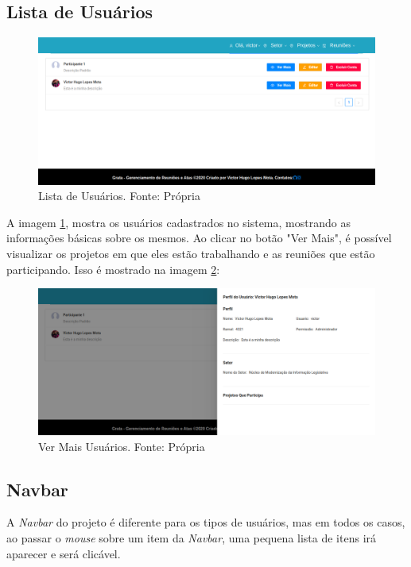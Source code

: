 \subsection{Lista de Usuários}

\begin{figure}[H]
    \centering
    \includegraphics[width=1.0\textwidth]{figuras/lista_de_usuarios.png}
    \caption{Lista de Usuários. Fonte: Própria}
    \label{img:lista_de_usuarios}
\end{figure}

A imagem \ref{img:lista_de_usuarios}, mostra os usuários cadastrados no sistema, mostrando as informações básicas sobre os mesmos. Ao clicar no botão "Ver Mais", é possível visualizar os projetos em que eles estão trabalhando e as reuniões que estão participando. Isso é mostrado na imagem \ref{img:ver_mais}:

\begin{figure}[H]
    \centering
    \includegraphics[width=1.0\textwidth]{figuras/ver_mais_usuarios.png}
    \caption{Ver Mais Usuários. Fonte: Própria}
    \label{img:ver_mais}
\end{figure}

\subsection{Navbar}

A \textit{Navbar} do projeto é diferente para os tipos de usuários, mas em todos os casos, ao passar o \textit{mouse} sobre um item da \textit{Navbar}, uma pequena lista de itens irá aparecer e será clicável.

